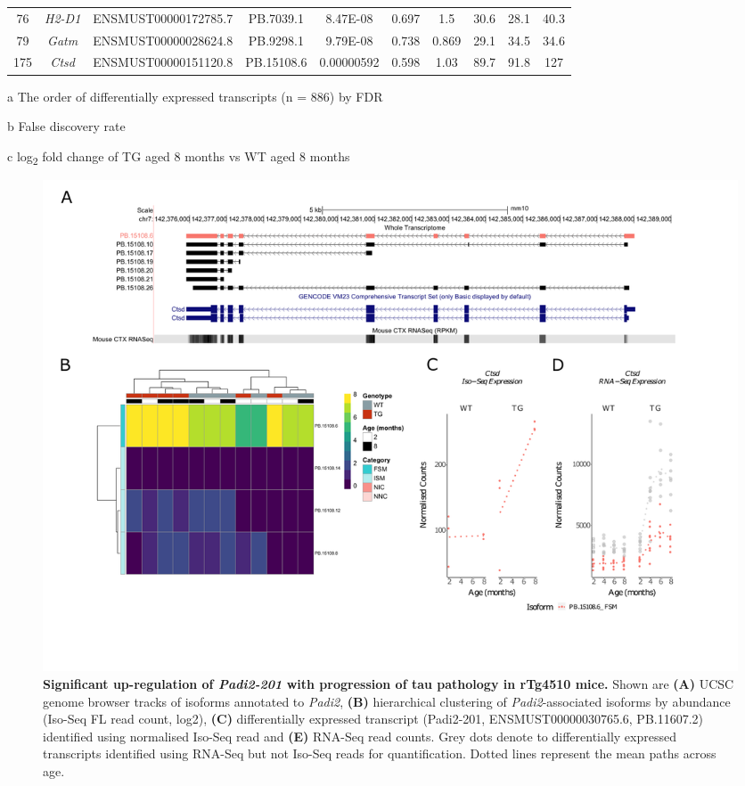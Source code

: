\begin{landscape}
\begin{table}[]
\begin{threeparttable}
\begin{tabular}{@{}cccccccccc@{}}
		76  & \textit{H2-D1}  & ENSMUST00000172785.7  & PB.7039.1  & 8.47E-08   & 0.697 & 1.5   & 30.6  & 28.1  & 40.3  \\
		79  & \textit{Gatm}   & ENSMUST00000028624.8  & PB.9298.1  & 9.79E-08   & 0.738 & 0.869 & 29.1  & 34.5  & 34.6  \\
		175 & \textit{Ctsd}   & ENSMUST00000151120.8  & PB.15108.6 & 0.00000592 & 0.598 & 1.03  & 89.7  & 91.8  & 127   \\ \bottomrule
	\end{tabular}
	\begin{tablenotes}
		\footnotesize
		\item[a] The order of differentially expressed transcripts (n = 886) by FDR
		\item[b] False discovery rate
		\item[c] log\textsubscript{2} fold change of TG aged 8 months vs WT aged 8 months
	\end{tablenotes}
	\end{threeparttable}
	\label{tab:DEI_trans}
\end{table}
\end{landscape}

\begin{landscape}
	\begin{figure}[!htp]
		\centering
		\includegraphics[page=4,trim={1.5cm 3.5cm 2cm 1cm}, scale = 0.85]{Figures/Ch5_DiffPlots_Landscape.pdf}
		\captionsetup{width=1.5\textwidth}
		\caption[Differential \textit{Padi2} transcript expression]%
		{\textbf{Significant up-regulation of \textit{Padi2-201} with progression of tau pathology in rTg4510 mice.} Shown are \textbf{(A)} UCSC genome browser tracks of isoforms annotated to \textit{Padi2}, \textbf{(B)} hierarchical clustering of \textit{Padi2}-associated isoforms by abundance (Iso-Seq FL read count, log2), \textbf{(C)} differentially expressed transcript (Padi2-201, ENSMUST00000030765.6, PB.11607.2) identified using normalised Iso-Seq read and \textbf{(E)} RNA-Seq read counts. Grey dots denote to differentially expressed transcripts identified using RNA-Seq but not Iso-Seq reads for quantification. Dotted lines represent the mean paths across age.}   
		\label{fig:Padi2}
	\end{figure}	
\end{landscape}

